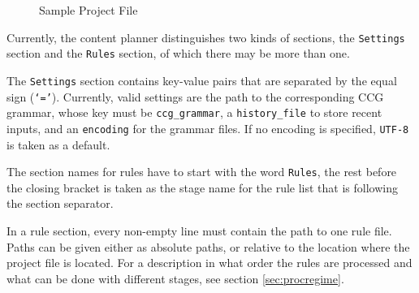 \documentclass[11pt,a4paper]{article}
\begin{document}
\begin{figure}[htbp]
\centering{}
  \caption{Sample Project File}
  \label{fig:projectfile}
\end{figure}

Currently, the content planner distinguishes two kinds of sections, the
\texttt{Settings} section and the \texttt{Rules} section, of which there may be
more than one.

The \texttt{Settings} section contains key-value pairs that are separated by
the equal sign (\texttt{`='}). Currently, valid settings are the path to the
corresponding CCG grammar, whose key must be \texttt{ccg\_grammar}, a
\texttt{history\_file} to store recent inputs, and an \texttt{encoding} for the
grammar files. If no encoding is specified, \texttt{UTF-8} is taken as a
default.

The section names for rules have to start with the word \texttt{Rules}, the
rest before the closing bracket is taken as the stage name for the rule
list that is following the section separator.

In a rule section, every non-empty line must contain the path to one rule
file. Paths can be given either as absolute paths, or relative to the location
where the project file is located. For a description in what order the rules
are processed and what can be done with different stages, see section
\ref{sec:procregime}.
\end{document}
